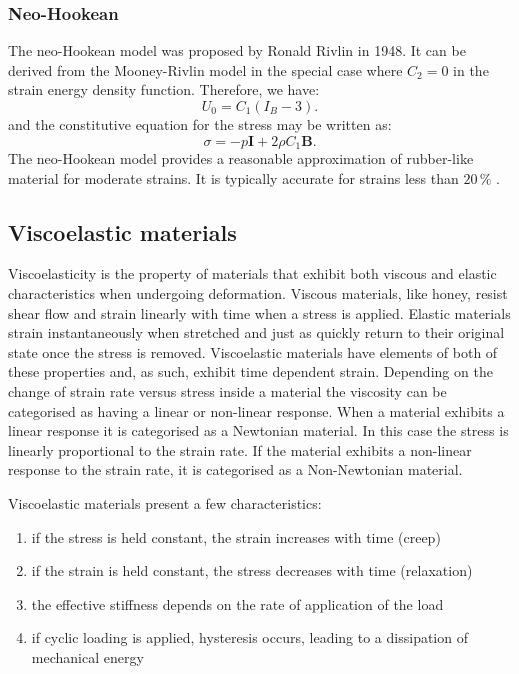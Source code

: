 	\subsubsection*{Neo-Hookean}			
The neo-Hookean model was proposed by Ronald Rivlin in 1948. It can be derived from the Mooney-Rivlin model in the special case where $C_2 = 0$ in the strain energy density function. Therefore, we have:
\begin{equation}
U_0 = C_1 (I_B-3).
\end{equation}
and the constitutive equation for the stress may be written as:
\begin{equation}
\sigma = -p \mathbf{I} + 2 \rho C_1 \mathbf{B}.
\end{equation}
The neo-Hookean model provides a reasonable approximation of rubber-like material for moderate strains. It is typically accurate for strains less than $20\, \%$ \citep{Gent01}.
			
			
	\subsection{Viscoelastic materials}
Viscoelasticity is the property of materials that exhibit both viscous and elastic characteristics when undergoing deformation. Viscous materials, like honey, resist shear flow and strain linearly with time when a stress is applied. Elastic materials strain instantaneously when stretched and just as quickly return to their original state once the stress is removed. Viscoelastic materials have elements of both of these properties and, as such, exhibit time dependent strain. Depending on the change of strain rate versus stress inside a material the viscosity can be categorised as having a linear or non-linear response. When a material exhibits a linear response it is categorised as a Newtonian material. In this case the stress is linearly proportional to the strain rate. If the material exhibits a non-linear response to the strain rate, it is categorised as a Non-Newtonian material. 

Viscoelastic materials present a few characteristics: 
\begin{enumerate}
\item if the stress is held constant, the strain increases with time (creep)
\item if the strain is held constant, the stress decreases with time (relaxation)
\item the effective stiffness depends on the rate of application of the load
\item if cyclic loading is applied, hysteresis occurs, leading to a dissipation of mechanical energy
\end{enumerate}

